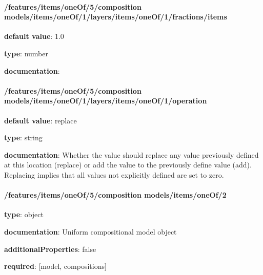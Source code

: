 \begin{itemized}
\paragraph{/features/items/oneOf/5/composition models/items/oneOf/1/layers/items/oneOf/1/fractions/items} \begin{itemized}
\item {\bf default value}: 1.0
\item {\bf type}: number
\item {\bf documentation}: 
\end{itemized}\end{itemized}\paragraph{/features/items/oneOf/5/composition models/items/oneOf/1/layers/items/oneOf/1/operation} \begin{itemized}
\item {\bf default value}: replace
\item {\bf type}: string
\item {\bf documentation}: Whether the value should replace any value previously defined at this location (replace) or add the value to the previously define value (add). Replacing implies that all values not explicitly defined are set to zero.
\end{itemized}\paragraph{/features/items/oneOf/5/composition models/items/oneOf/2} \begin{itemized}
\item {\bf type}: object
\item {\bf documentation}: Uniform compositional model object
\item {\bf additionalProperties}: false
\item {\bf required}: [model, compositions]\end{itemized}
